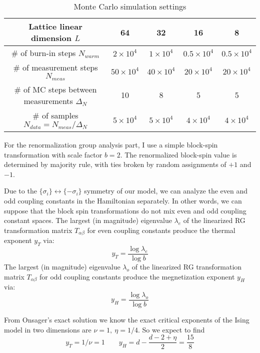 \documentclass{article}
\begin{document}
\begin{table}[H]
\centering
\begin{tabular}{|c|c|c|c|c|} 
 \hline
 Lattice linear dimension $L$ & 64 & 32 & 16 & 8 \\ 
 \hline
 \# of burn-in steps $N_{warm}$ & $2\times 10^4$& $1\times 10^4$& $0.5\times 10^4$& $0.5\times 10^4$ \\ 
 \hline
 \# of measurement steps $N_{meas}$& $50\times 10^4$& $40\times 10^4$& $20\times 10^4$& $20\times 10^4$\\
 \hline
 \# of MC steps between measurements $\Delta_N$ & 10 & 8 & 5 & 5 \\
 \hline
 \# of samples $N_{data} = N_{meas}/\Delta_{N}$ & $5\times 10^4$& $5\times 10^4$& $4\times 10^4$& $4\times 10^4$ \\
 \hline
 \end{tabular}
 \caption{\label{MCSettings}Monte Carlo simulation settings}
\end{table}

For the renormalization group analysis part, I use a simple block-spin transformation with scale factor $b = 2$. The renormalized block-spin value is determined by majority rule, with ties broken by random assignments of $+1$ and $-1$.  


Due to the $\{\sigma_i\} \leftrightarrow \{-\sigma_i\}$ symmetry of our model, we can analyze the even and odd coupling constants in the Hamiltonian separately. In other words, we can suppose that the block spin transformations do not mix even and odd coupling constant spaces. The largest (in magnitude) eigenvalue $\lambda_e$ of the linearized RG transformation matrix $T_{\alpha\beta}$ for even coupling constants produce the thermal exponent $y_T$ via:
\begin{equation}
y_T = \frac{\log \lambda_e}{\log b}
\end{equation}
The largest (in magnitude) eigenvalue $\lambda_o$ of the linearized RG transformation matrix $T_{\alpha\beta}$ for odd coupling constants  produce the megnetization exponent $y_H$ via:
\begin{equation}
y_H = \frac{\log \lambda_o}{\log b}
\end{equation}

From Onsager's exact solution \cite{Onsager1944} we know the exact critical exponents of the Ising model in two dimensions are $\nu = 1 ,\  \eta = 1/4$. So we expect to find
\begin{equation*}
y_T = 1/\nu = 1 \qquad y_H = d-\frac{d-2+\eta}{2}= \frac{15}{8}
\end{equation*}
\end{document}
